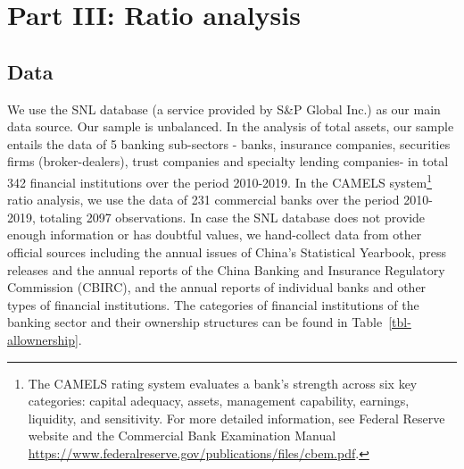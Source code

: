 \documentclass[
  12pt,
  a4paper,
]{scrreprt}
\begin{document}
\section{Part III: Ratio analysis}\label{part-iii-ratio-analysis}

\subsection{Data}\label{data}

We use the SNL database (a service provided by S\&P Global Inc.) as our
main data source. Our sample is unbalanced. In the analysis of total
assets, our sample entails the data of 5 banking sub-sectors - banks,
insurance companies, securities firms (broker-dealers), trust companies
and specialty lending companies- in total 342 financial institutions
over the period 2010-2019. In the CAMELS system\footnote{The CAMELS
  rating system evaluates a bank's strength across six key categories:
  capital adequacy, assets, management capability, earnings, liquidity,
  and sensitivity. For more detailed information, see Federal Reserve
  website and the Commercial Bank Examination Manual
  \url{https://www.federalreserve.gov/publications/files/cbem.pdf}.}
ratio analysis, we use the data of 231 commercial banks over the period
2010-2019, totaling 2097 observations. In case the SNL database does not
provide enough information or has doubtful values, we hand-collect data
from other official sources including the annual issues of China's
Statistical Yearbook, press releases and the annual reports of the China
Banking and Insurance Regulatory Commission (CBIRC), and the annual
reports of individual banks and other types of financial institutions.
The categories of financial institutions of the banking sector and their
ownership structures can be found in Table~\ref{tbl-allownership}.

\begingroup\fontsize{8}{10}\selectfont
\end{document}
